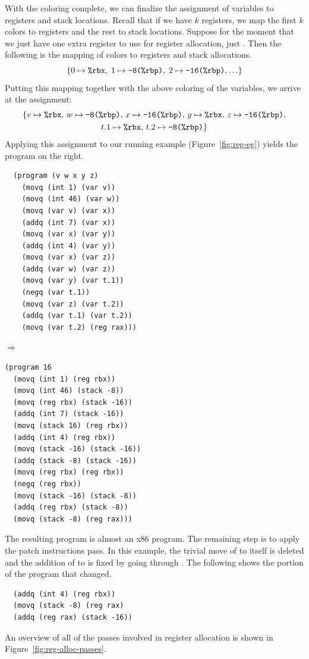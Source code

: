 \documentclass[11pt]{book}
\begin{document}
With the coloring complete, we can finalize the assignment of
variables to registers and stack locations. Recall that if we have $k$
registers, we map the first $k$ colors to registers and the rest to
stack locations.  Suppose for the moment that we just have one extra
register to use for register allocation, just . Then the
following is the mapping of colors to registers and stack allocations.
\[
  \{ 0 \mapsto \texttt{\%rbx}, \; 1 \mapsto \texttt{-8(\%rbp)}, \; 2 \mapsto \texttt{-16(\%rbp)}, \ldots \}
\]
Putting this mapping together with the above coloring of the variables, we
arrive at the assignment:
\begin{gather*}
  \{ v \mapsto \texttt{\%rbx}, \,
  w \mapsto \texttt{-8(\%rbp)},  \,
  x \mapsto \texttt{-16(\%rbp)}, \,
  y \mapsto \texttt{\%rbx},  \,
  z\mapsto \texttt{-16(\%rbp)}, \\
  t.1\mapsto \texttt{\%rbx} ,\,
  t.2\mapsto \texttt{-8(\%rbp)} \}
\end{gather*}
Applying this assignment to our running example
(Figure~\ref{fig:reg-eg}) yields the program on the right.

\begin{minipage}{0.45\textwidth}
\begin{lstlisting}
  (program (v w x y z)
    (movq (int 1) (var v))
    (movq (int 46) (var w))
    (movq (var v) (var x))
    (addq (int 7) (var x))
    (movq (var x) (var y))
    (addq (int 4) (var y))
    (movq (var x) (var z))
    (addq (var w) (var z))
    (movq (var y) (var t.1))
    (negq (var t.1))
    (movq (var z) (var t.2))
    (addq (var t.1) (var t.2))
    (movq (var t.2) (reg rax)))
\end{lstlisting}
\end{minipage}
$\Rightarrow$
\begin{minipage}{0.45\textwidth}
\begin{lstlisting}
(program 16
  (movq (int 1) (reg rbx))
  (movq (int 46) (stack -8))
  (movq (reg rbx) (stack -16))
  (addq (int 7) (stack -16))
  (movq (stack 16) (reg rbx))
  (addq (int 4) (reg rbx))
  (movq (stack -16) (stack -16))
  (addq (stack -8) (stack -16))
  (movq (reg rbx) (reg rbx))
  (negq (reg rbx))
  (movq (stack -16) (stack -8))
  (addq (reg rbx) (stack -8))
  (movq (stack -8) (reg rax)))
\end{lstlisting}
\end{minipage}

The resulting program is almost an x86 program. The remaining step
is to apply the patch instructions pass. In this example, the trivial
move of  to itself is deleted and the addition of
 to  is fixed by going through
. The following shows the portion of the program that
changed.
\begin{lstlisting}
  (addq (int 4) (reg rbx))
  (movq (stack -8) (reg rax)
  (addq (reg rax) (stack -16))
\end{lstlisting}
An overview of all of the passes involved in register allocation is
shown in Figure~\ref{fig:reg-alloc-passes}.
\end{document}
